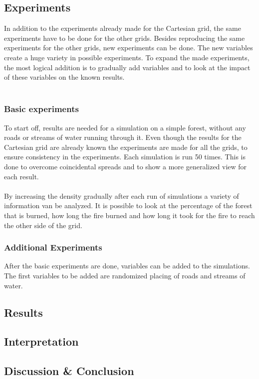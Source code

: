 \documentclass{article}
\begin{document}
\begin{multicols}{2}
\subsection*{Experiments}
In addition to the experiments already made for the Cartesian grid, the same experiments have to be done for the other grids. Besides reproducing the same experiments for the other grids, new experiments can be done. The new variables create a huge variety in possible experiments. To expand the made experiments, the most logical addition is to gradually add variables and to look at the impact of these variables on the known results.\\\\

\subsubsection*{Basic experiments}
To start off, results are needed for a simulation on a simple forest, without any roads or streams of water running through it. Even though the results for the Cartesian grid are already known the experiments are made for all the grids, to ensure consistency in the experiments. Each simulation is run 50 times. This is done to overcome coincidental spreads and to show a more generalized view for each result.\\\\
By increasing the density gradually after each run of simulations a variety of information van be analyzed. It is possible to look at the percentage of the forest that is burned, how long the fire burned and how long it took for the fire to reach the other side of the grid.
\subsubsection*{Additional Experiments}
After the basic experiments are done, variables can be added to the simulations. The first variables to be added are randomized placing of roads and streams of water.  
\subsection*{Results}
\subsection*{Interpretation}

\subsection*{Discussion \& Conclusion}



\end{multicols}
\end{document}
